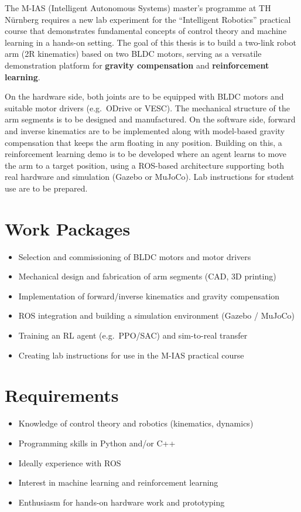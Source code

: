 \documentclass{ohm_project_description}
\begin{document}
\maketitle
\thispagestyle{fancy}

The M-IAS (Intelligent Autonomous Systems) master's programme at TH Nürnberg requires a new lab experiment for the ``Intelligent Robotics'' practical course that demonstrates fundamental concepts of control theory and machine learning in a hands-on setting. The goal of this thesis is to build a two-link robot arm (2R kinematics) based on two BLDC motors, serving as a versatile demonstration platform for \textbf{gravity compensation} and \textbf{reinforcement learning}.

On the hardware side, both joints are to be equipped with BLDC motors and suitable motor drivers (e.g.\ ODrive or VESC). The mechanical structure of the arm segments is to be designed and manufactured. On the software side, forward and inverse kinematics are to be implemented along with model-based gravity compensation that keeps the arm floating in any position. Building on this, a reinforcement learning demo is to be developed where an agent learns to move the arm to a target position, using a ROS-based architecture supporting both real hardware and simulation (Gazebo or MuJoCo). Lab instructions for student use are to be prepared.

\section*{Work Packages}
\begin{itemize}[leftmargin=0.5cm]
    \setlength\itemsep{.1em}
    \item Selection and commissioning of BLDC motors and motor drivers
    \item Mechanical design and fabrication of arm segments (CAD, 3D printing)
    \item Implementation of forward/inverse kinematics and gravity compensation
    \item ROS integration and building a simulation environment (Gazebo / MuJoCo)
    \item Training an RL agent (e.g.\ PPO/SAC) and sim-to-real transfer
    \item Creating lab instructions for use in the M-IAS practical course
\end{itemize}

\section*{Requirements}
\begin{itemize}[leftmargin=0.5cm]
    \setlength\itemsep{.1em}
    \item Knowledge of control theory and robotics (kinematics, dynamics)
    \item Programming skills in Python and/or C++
    \item Ideally experience with ROS
    \item Interest in machine learning and reinforcement learning
    \item Enthusiasm for hands-on hardware work and prototyping
\end{itemize}
\end{document}
